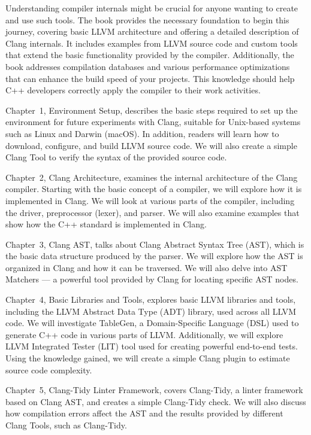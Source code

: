 Understanding compiler internals might be crucial for anyone wanting to create and use such tools. The book provides the necessary foundation to begin this journey, covering basic LLVM architecture and offering a detailed description of Clang internals. It includes examples from LLVM source code and custom tools that extend the basic functionality provided by the compiler. Additionally, the book addresses compilation databases and various performance optimizations that can enhance the build speed of your projects. This knowledge should help C++ developers correctly apply the compiler to their work activities.


Chapter 1, Environment Setup, describes the basic steps required to set up the environment for future experiments with Clang, suitable for Unix-based systems such as Linux and Darwin (macOS). In addition, readers will learn how to download, configure, and build LLVM source code. We will also create a simple Clang Tool to verify the syntax of the provided source code.

Chapter 2, Clang Architecture, examines the internal architecture of the Clang compiler. Starting with the basic concept of a compiler, we will explore how it is implemented in Clang. We will look at various parts of the compiler, including the driver, preprocessor (lexer), and parser. We will also examine examples that show how the C++ standard is implemented in Clang.

Chapter 3, Clang AST, talks about Clang Abstract Syntax Tree (AST), which is the basic data structure produced by the parser. We will explore how the AST is organized in Clang and how it can be traversed. We will also delve into AST Matchers — a powerful tool provided by Clang for locating specific AST nodes.

Chapter 4, Basic Libraries and Tools, explores basic LLVM libraries and tools, including the LLVM Abstract Data Type (ADT) library, used across all LLVM code. We will investigate TableGen, a Domain-Specific Language (DSL) used to generate C++ code in various parts of LLVM. Additionally, we will explore LLVM Integrated Tester (LIT) tool used for creating powerful end-to-end tests. Using the knowledge gained, we will create a simple Clang plugin to estimate source code complexity.

Chapter 5, Clang-Tidy Linter Framework, covers Clang-Tidy, a linter framework based on Clang AST, and creates a simple Clang-Tidy check. We will also discuss how compilation errors affect the AST and the results provided by different Clang Tools, such as Clang-Tidy.

